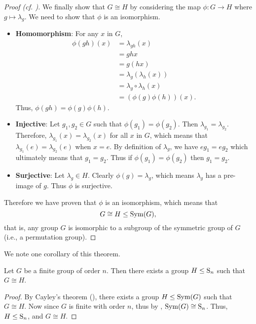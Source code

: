 \begin{proof}[Proof (cf. {\cite[Proof 2]{proofwiki_cayleys-theorem}})]
    We finally show that $G \cong H$ by considering the map $\phi: G\to H$ where $g \mapsto \lambda_g$. We need to show that $\phi$ is an isomorphism.
    \begin{itemize}
        \item \textbf{Homomorphism}: For any $x$ in $G$,
            \begin{align*}
                \phi(gh)(x) &= \lambda_{gh}(x)\\
                &= ghx\\
                &= g(hx)\\
                &= \lambda_g\left(\lambda_h(x)\right)\\
                &= \lambda_g\circ\lambda_h(x)\\
                &= (\phi(g)\phi(h))(x).
            \end{align*}
            Thus, $\phi(gh) = \phi(g)\phi(h)$.
        
        \item \textbf{Injective}: Let $g_1, g_2 \in G$ such that $\phi(g_1) = \phi(g_2)$. Then $\lambda_{g_1} = \lambda_{g_2}$. Therefore, $\lambda_{g_1}(x) = \lambda_{g_2}(x)$ for all $x$ in $G$, which means that $\lambda_{g_1}(e) = \lambda_{g_2}(e)$ when $x = e$. By definition of $\lambda_g$, we have $eg_1 = eg_2$ which ultimately means that $g_1=g_2$. Thus if $\phi(g_1) = \phi(g_2)$ then $g_1=g_2$.
        
        \item \textbf{Surjective}: Let $\lambda_g \in H$. Clearly $\phi(g) = \lambda_g$, which means $\lambda_g$ has a pre-image of $g$. Thus $\phi$ is surjective.
    \end{itemize}
    Therefore we have proven that $\phi$ is an isomorphism, which means that
    \[
        G \cong H \leq \mathrm{Sym}(G),
    \]
    that is, any group $G$ is isomorphic to a subgroup of the symmetric group of $G$ (i.e., a permutation group).
\end{proof}

\newpage

We note one corollary of this theorem.
\begin{corollary}
    Let $G$ be a finite group of order $n$. Then there exists a group $H \leq \mathrm{S}_{n}$ such that $G \cong H$.
\end{corollary}
\begin{proof}
    By Cayley's theorem (), there exists a group $H \leq \mathrm{Sym}(G)$ such that $G \cong H$. Now since $G$ is finite with order $n$, thus by , $\mathrm{Sym}(G) \cong \mathrm{S}_{n}$. Thus, $H \leq \mathrm{S}_{n}$, and $G \cong H$.
\end{proof}

